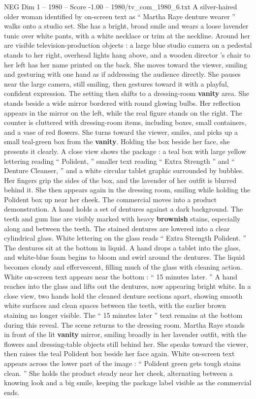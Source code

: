 \begin{textsample}{NEG Dim 1 – 1980 – Score -1.00 – 1980/tv\_com\_1980\_6.txt}  \label{ex:f1_neg_049}
A silver-haired older woman identified by on-screen text as “ Martha Raye denture wearer ” walks onto a studio set.
She has a bright, broad smile and wears a loose lavender tunic over white pants, with a white necklace or trim at the neckline.
Around her are visible television-production objects : a large blue studio camera on a pedestal stands to her right, overhead lights hang above, and a wooden director ’s chair to her left has her name printed on the back.
She moves toward the viewer, smiling and gesturing with one hand as if addressing the audience directly.
She pauses near the large camera, still smiling, then gestures toward it with a playful, confident expression.
The setting then shifts to a dressing-room \textbf{vanity} area.
She stands beside a wide mirror bordered with round glowing bulbs.
Her reflection appears in the mirror on the left, while the real figure stands on the right.
The counter is cluttered with dressing-room items, including boxes, small containers, and a vase of red flowers.
She turns toward the viewer, smiles, and picks up a small teal-green box from the \textbf{vanity}.
Holding the box beside her face, she presents it clearly.
A close view shows the package : a teal box with large yellow lettering reading “ Polident, ” smaller text reading “ Extra Strength ” and “ Denture Cleanser, ” and a white circular tablet graphic surrounded by bubbles.
Her fingers grip the sides of the box, and the lavender of her outfit is blurred behind it.
She then appears again in the dressing room, smiling while holding the Polident box up near her cheek.
The commercial moves into a product demonstration.
A hand holds a set of dentures against a dark background.
The teeth and gum line are visibly marked with heavy \textbf{brownish} stains, especially along and between the teeth.
The stained dentures are lowered into a clear cylindrical glass.
White lettering on the glass reads “ Extra Strength Polident. ” The dentures sit at the bottom in liquid.
A hand drops a tablet into the glass, and white-blue foam begins to bloom and swirl around the dentures.
The liquid becomes cloudy and effervescent, filling much of the glass with cleaning action.
White on-screen text appears near the bottom : “ 15 minutes later. ” A hand reaches into the glass and lifts out the dentures, now appearing bright white.
In a close view, two hands hold the cleaned denture sections apart, showing smooth white surfaces and clean spaces between the teeth, with the earlier brown staining no longer visible.
The “ 15 minutes later ” text remains at the bottom during this reveal.
The scene returns to the dressing room.
Martha Raye stands in front of the lit \textbf{vanity} mirror, smiling broadly in her lavender outfit, with the flowers and dressing-table objects still behind her.
She speaks toward the viewer, then raises the teal Polident box beside her face again.
White on-screen text appears across the lower part of the image : “ Polident green gets tough stains clean. ” She holds the product steady near her cheek, alternating between a knowing look and a big smile, keeping the package label visible as the commercial ends.

\end{textsample}

